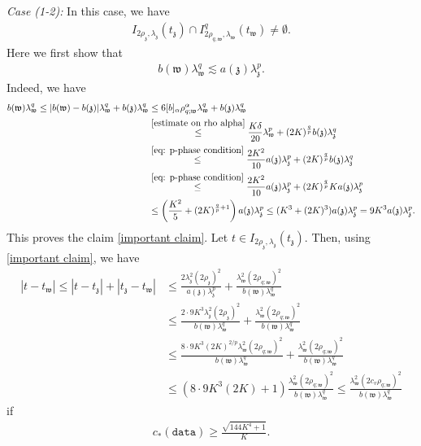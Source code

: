 \documentclass[11pt,oneside, english,reqno,twoside a4paper]{amsart}
\theoremstyle{definition}
\numberwithin{theorem}{section}
\numberwithin{equation}{section}
\newcommand{\mfz}{\mathfrak{z}}
\newcommand{\mfw}{\mathfrak{w}}
\newcommand{\apprle}{\lesssim}
\begin{document}
\noindent \textit{Case (1-2):} In this case, we have
\begin{align*}
    I_{2\rho_{\mathfrak{z}}, \lambda_{\mathfrak{z}}}(t_{\mathfrak{z}})\cap I^q_{2\rho_{q, \mathfrak{w}}, \lambda_{\mathfrak{w}}}(t_{\mathfrak{w}})\neq \emptyset.
\end{align*}
Here we first show that
\begin{align}\label{important claim}
    b(\mfw)\lambda^q_{\mfw}\apprle a(\mfz)\lambda^p_{\mfz}.
\end{align}
Indeed, we have
\begin{align*}
    b(\mfw)\lambda^q_{\mfw}\leq |b(\mfw)-b(\mfz)|\lambda^q_{\mfw}+b(\mfz)\lambda^q_{\mfw}&\leq 6[b]_{\alpha}\rho^{\alpha}_{q; \mfw}\lambda^q_{\mfw}+b(\mfz)\lambda^q_{\mfw}\\
    &\overset{\eqref{estimate on rho alpha}}{\leq} \frac{K \delta}{20}\lambda^p_{\mfw}+(2K)^{\frac{q}{p}}b(\mfz)\lambda^q_{\mfz}\\ 
    &\overset{\eqref{eq: p-phase condition}}{\leq} \frac{2K^2}{10}a(\mfz)\lambda^p_{\mfz}+(2K)^{\frac{q}{p}}b(\mfz)\lambda^q_{\mfz}\\
    &\overset{\eqref{eq: p-phase condition}}{\leq} \frac{2K^2}{10}a(\mfz)\lambda^p_{\mfz}+(2K)^{\frac{q}{p}}Ka(\mfz)\lambda^p_{\mfz}\\
    &\leq \left(\frac{K^2}{5}+(2K)^{\frac{q}{p}+1}\right)a(\mfz)\lambda^p_{\mfz}
    \leq (K^3+(2K)^3)a(\mfz)\lambda^p_{\mfz}=9K^3a(\mfz)\lambda^p_{\mfz}.
\end{align*}
This proves the claim \eqref{important claim}.
Let $t \in I_{2\rho_{\mathfrak{z}}, \lambda_{\mathfrak{z}}}(t_{\mathfrak{z}}).$ Then, using \eqref{important claim}, we have 
\begin{align*}
    |t-t_{\mathfrak{w}}|\leq |t-t_{\mathfrak{z}}|+|t_{\mathfrak{z}}-t_{\mathfrak{w}}|&\leq \frac{2\lambda^{2}_{\mathfrak{z}}(2\rho_{\mathfrak{z}})^2}{a(\mathfrak{z})\lambda^p_{\mfz}}+\frac{\lambda^{2}_{\mathfrak{w}}(2\rho_{q;\mathfrak{w}})^2}{b(\mathfrak{w})\lambda^q_{\mfw}}\\
    &\leq \frac{2\cdot 9K^3\lambda^2_{\mfz}(2\rho_{\mfz})^2}{b(\mfw)\lambda^q_{\mfw}}+\frac{\lambda^{2}_{\mathfrak{w}}(2\rho_{q;\mathfrak{w}})^2}{b(\mathfrak{w})\lambda^q_{\mfw}}\\
    &\leq\frac{8\cdot 9K^3(2K)^{2/p}\lambda^2_{\mfw}(2\rho_{q;\mfw})^2}{b(\mfw)\lambda^q_{\mfw}}+\frac{\lambda^{2}_{\mathfrak{w}}(2\rho_{q;\mathfrak{w}})^2}{b(\mathfrak{w})\lambda^q_{\mfw}}\\
    &\leq\left(8\cdot 9K^3(2K)+1\right)\frac{\lambda^{2}_{\mathfrak{w}}(2\rho_{q;\mathfrak{w}})^2}{b(\mathfrak{w})\lambda^q_{\mfw}}\leq \frac{\lambda^{2}_{\mathfrak{w}}(2c_v\rho_{q;\mathfrak{w}})^2}{b(\mathfrak{w})\lambda^q_{\mfw}}
\end{align*}
if \begin{align}\label{c_2}c_*(\texttt{data} )\geq \frac{\sqrt{144K^4+1}}{K}.\end{align}
\end{document}
